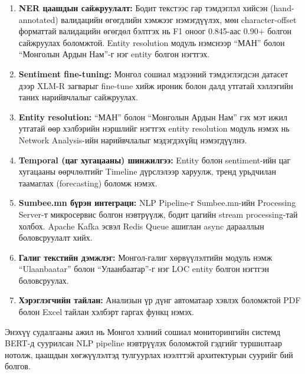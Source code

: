 \begin{enumerate}
    \item \textbf{NER цаашдын сайжруулалт:} Бодит текстээс гар тэмдэглэл хийсэн (hand-annotated) валидацийн өгөгдлийн хэмжээг нэмэгдүүлэх, мөн character-offset форматтай валидацийн өгөгдөл бэлтгэх нь F1 оноог 0.845-аас 0.90+ болгон сайжруулах боломжтой. Entity resolution модуль нэмснээр ``МАН'' болон ``Монголын Ардын Нам''-г нэг entity болгон нэгтгэх.

    \item \textbf{Sentiment fine-tuning:} Монгол сошиал мэдээний тэмдэглэгдсэн датасет дээр XLM-R загварыг fine-tune хийж ироник болон далд утгатай хэллэгийн таних нарийвчлалыг сайжруулах.

    \item \textbf{Entity resolution:} ``МАН'' болон ``Монголын Ардын Нам'' гэх мэт ижил утгатай өөр хэлбэрийн нэршлийг нэгтгэх entity resolution модуль нэмэх нь Network Analysis-ийн нарийвчлалыг мэдэгдэхүйц нэмэгдүүлнэ.

    \item \textbf{Temporal (цаг хугацааны) шинжилгээ:} Entity болон sentiment-ийн цаг хугацааны өөрчлөлтийг Timeline дүрслэлээр харуулж, тренд урьдчилан таамаглах (forecasting) боломж нэмэх.

    \item \textbf{Sumbee.mn бүрэн интеграци:} NLP Pipeline-г Sumbee.mn-ийн Processing Server-т микросервис болгон нэвтрүүлж, бодит цагийн stream processing-тай холбох. Apache Kafka эсвэл Redis Queue ашиглан async дарааллын боловсруулалт хийх.

    \item \textbf{Галиг текстийн дэмжлэг:} Монгол-галиг хөрвүүлэлтийн модуль нэмж ``Ulaanbaatar'' болон ``Улаанбаатар''-г нэг LOC entity болгон нэгтгэн боловсруулах.

    \item \textbf{Хэрэглэгчийн тайлан:} Анализын үр дүнг автоматаар хэвлэх боломжтой PDF болон Excel тайлан хэлбэрт гаргах функц нэмэх.
\end{enumerate}

Энэхүү судалгааны ажил нь Монгол хэлний сошиал мониторингийн системд BERT-д суурилсан NLP pipeline нэвтрүүлэх боломжтой гэдгийг туршилтаар нотолж, цаашдын хөгжүүлэлтэд тулгуурлах нээлттэй архитектурын суурийг бий болгов.
